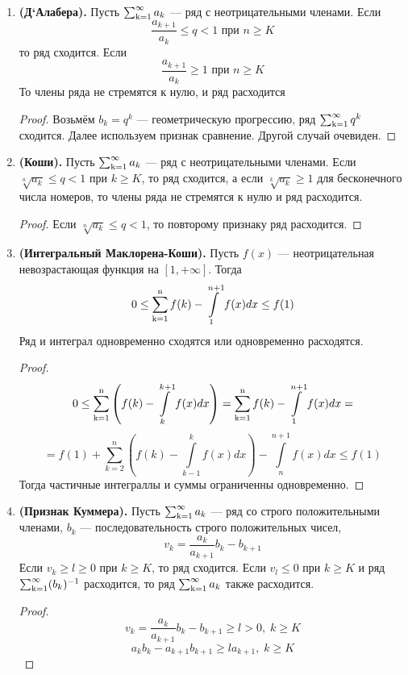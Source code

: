 \begin{enumerate}
\begin{proof}
$$ \prod_{k+K}^{n-1}\frac{a_{k+1}}{a_k} \le \prod_{k+K}^{n-1}\frac{b_{k+1}}{b_k}\text{, т.е. } \frac{a_{n}}{a_K} \le \frac{b_{n}}{b_K}, n>K$$
Значит, $a_n \le \frac{a_K}{b_K}b_n, n>K$, поэтому из сходимости ряда $\ssum b_k$ следует сходимость ряда $\ssum a_k$
\end{proof}
\item
\textbf{(Д`Алабера).} Пусть $\ssum a_k$ --- ряд с неотрицательными членами. Если
$$\frac{a_{k+1}}{a_k} \le q < 1 \text{ при } n\ge K$$
то ряд сходится. Если
$$ \frac{a_{k+1}}{a_k} \ge 1 \text{ при } n \ge K$$
То члены ряда не стремятся к нулю, и ряд расходится
\begin{proof}
Возьмём $b_k = q^k$ --- геометрическую прогрессию, ряд $\operatorname{\sum_{k=1}^{\infty}} q^k$ сходится.
Далее используем признак сравнение. Другой случай очевиден.
\end{proof}
\item
\textbf{(Коши).} Пусть $\ssum a_k$ --- ряд с неотрицательными членами. Если $ \sqrt[n]{a_k}\le q < 1$ при $k \ge K $,
то ряд сходится, а если $ \sqrt[k]{a_k}\ge 1$ для бесконечного числа номеров, то члены ряда не стремятся к нулю и ряд расходится.
\begin{proof}
Если  $\sqrt[n]{a_k}\le q < 1$, то повторому признаку ряд расходится. 
\end{proof}
\item
\textbf{(Интегральный Маклорена-Коши).} Пусть $f(x)$ --- неотрицательная невозрастающая функция на $ [1,+\infty] $. Тогда
$$ 0 \le \operatorname{\sum_{k=1}^{n}} f(k) - \int\limits_1^{n+1}f(x)dx\le f(1)$$
Ряд и интеграл одновременно сходятся или одновременно расходятся.
\begin{proof}
$$ 0\le \operatorname{\sum_{k=1}^{n}} \left( f(k) - \int\limits_k^{k+1}f(x)dx \right) = \operatorname{\sum_{k=1}^{n}} f(k) - \int\limits_1^{n+1}f(x)dx = $$
$$ = f(1)+\sum_{k=2}^n \left( f(k) - \int\limits_{k-1}^k f(x)dx \right) - \int\limits_n^{n+1} f(x)dx \le f(1)$$
Тогда частичные интеграллы и суммы ограниченны одновременно.
\end{proof}
\item
\textbf{(Признак Куммера).} Пусть $\ssum a_k$ --- ряд со строго положительными членами,
$b_k$ --- последовательность строго положительных чисел,
$$ v_k = \frac{a_k}{a_{k+1}}b_k - b_{k+1}$$
Если $v_k \ge l \ge 0$ при $k \ge K$, то ряд сходится. Если $v_l \le 0$ при $k \ge K$ и ряд $\operatorname{\sum_{k=1}^{\infty}} (b_k)^{-1}$ расходится, то ряд $\ssum a_k$ также расходится.
\begin{proof}
$$v_k = \frac{a_k}{a_{k+1}} b_k - b_{k+1} \ge l	> 0,\; k \ge K$$
$$a_k b_k-a_{k+1}b_{k+1} \ge l a_{k+1},\; k\ge K$$

\end{proof}
\end{enumerate}
